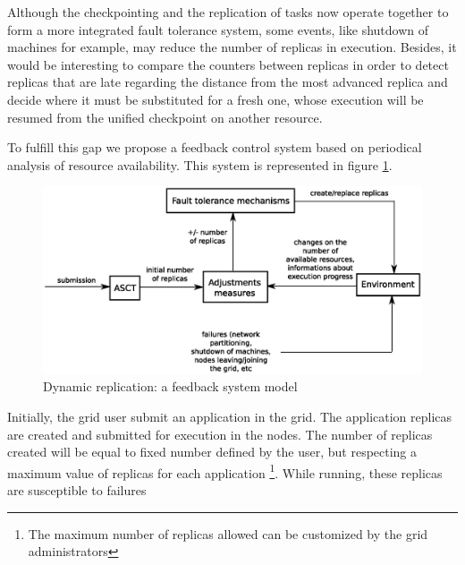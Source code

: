 \documentclass[times, 09pt, twocolumn]{article}
\begin{document}
Although the checkpointing and the replication of tasks now operate together to
form a more integrated fault tolerance system, some events, like shutdown of
machines for example, may reduce the number of replicas in execution. Besides,
it would be interesting to compare the counters between replicas in order to
detect replicas that are late regarding the distance from the most advanced
replica and decide where it must be substituted for a fresh one, whose
execution will be resumed from the unified checkpoint on another resource.

To fulfill this gap we propose a feedback control system based on periodical
analysis of resource availability. This system is represented in figure
\ref{fig:feedback}.

 
%
%
\begin{figure}[th]
\centering \includegraphics[width=1.1\columnwidth]{feedback.eps}
\caption{Dynamic replication: a feedback system model}
\label{fig:feedback}
\end{figure}
%
Initially, the grid user submit an application in the grid. The application
replicas are created and submitted for execution in the nodes. The number of
replicas created will be equal to fixed number defined by the user, but
respecting a maximum value of replicas for each application \footnote{The
maximum number of replicas allowed can be customized by the grid
administrators}. While running, these replicas are susceptible to failures
\end{document}
